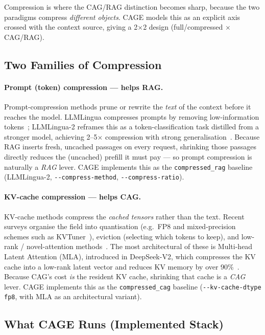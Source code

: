 \documentclass[12pt,a4paper]{article}
\let\cite\citep
\begin{document}
Compression is where the CAG/RAG distinction becomes sharp, because the two
paradigms compress \emph{different objects}. CAGE models this as an explicit axis
crossed with the context source, giving a 2$\times$2 design (full/compressed
$\times$ CAG/RAG).

\subsection{Two Families of Compression}

\paragraph{Prompt (token) compression --- helps RAG.} Prompt-compression methods
prune or rewrite the \emph{text} of the context before it reaches the model.
LLMLingua compresses prompts by removing low-information
tokens~\cite{llmlingua}; LLMLingua-2 reframes this as a token-classification task
distilled from a stronger model, achieving 2--5$\times$ compression with strong
generalisation~\cite{llmlingua2}. Because RAG inserts fresh, uncached passages on
every request, shrinking those passages directly reduces the (uncached) prefill it
must pay --- so prompt compression is naturally a \emph{RAG} lever. CAGE implements
this as the \texttt{compressed\_rag} baseline (LLMLingua-2,
\texttt{-{}-compress-method}, \texttt{-{}-compress-ratio}).

\paragraph{KV-cache compression --- helps CAG.} KV-cache methods compress the
\emph{cached tensors} rather than the text. Recent surveys organise the field into
quantisation (e.g.\ FP8 and mixed-precision schemes such as
KVTuner~\cite{kvtuner}), eviction (selecting which tokens to keep), and low-rank /
novel-attention methods~\cite{kvcompresssurvey, li2024kvsurvey,
javidnia2025kvccompress}. The most architectural of these is Multi-head Latent
Attention (MLA), introduced in DeepSeek-V2, which compresses the KV cache into a
low-rank latent vector and reduces KV memory by over 90\%~\cite{deepseekv2}.
Because CAG's cost \emph{is} the resident KV cache, shrinking that cache is a
\emph{CAG} lever. CAGE implements this as the \texttt{compressed\_cag} baseline
(\texttt{-{}-kv-cache-dtype fp8}, with MLA as an architectural variant).

\subsection{What CAGE Runs (Implemented Stack)}
\end{document}
